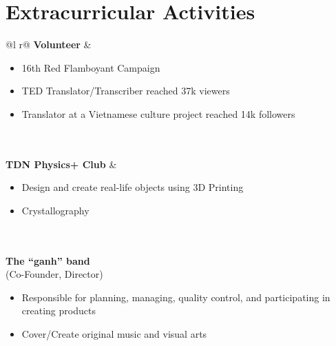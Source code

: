 \documentclass[a4paper,12pt]{article}
\begin{document}
\section{Extracurricular Activities}

\begin{tabularx}{\linewidth}{ @{}l r@{} }
\textbf{Volunteer} & \hfill 
{} {
\begin{itemize}
	\item 16th Red Flamboyant Campaign 
    \item TED Translator/Transcriber \hfill reached 37k viewers
    \item Translator at a Vietnamese culture project \hfill reached 14k followers
\end{itemize}
}  \\
\\
\textbf{TDN Physics+ Club} & \hfill 
{} {
\begin{itemize}
	\item Design and create real-life objects using 3D Printing
    \item Crystallography
\end{itemize}
}  \\
\\

\textbf{The “ganh” band}  \\
\footnotesize (Co-Founder, Director)
\\
 {
\begin{itemize}
	\item Responsible for planning, managing, quality control, and participating in creating products
    \item Cover/Create original music and visual arts 
\end{itemize} 
}\\
\end{tabularx}
\end{document}
